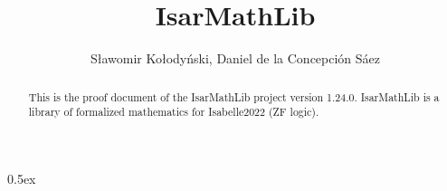 \documentclass[11pt,a4paper]{article}
\begin{document}
\title{IsarMathLib}
\author{S\l awomir Ko\l ody\'{n}ski, Daniel de la Concepci\'{o}n S\'{a}ez}
\maketitle

\begin{abstract}
This is the proof document of the IsarMathLib project version 1.24.0. 
IsarMathLib is a library of formalized mathematics for Isabelle2022 (ZF logic). 
 
\end{abstract}

\tableofcontents

\parindent 0pt\parskip 0.5ex





\end{document}
